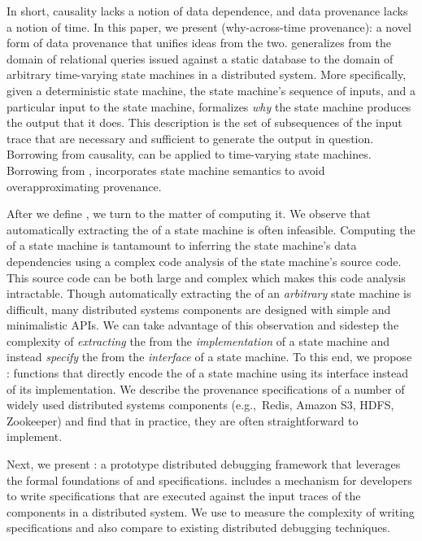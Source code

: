 In short, causality lacks a notion of data dependence, and data provenance
lacks a notion of time. In this paper, we present 
(why-across-time provenance): a novel form of data provenance that unifies
ideas from the two. \Watprovenance{} generalizes \whyprovenance{} from the
domain of relational queries issued against a static database to the domain of
arbitrary time-varying state machines in a distributed system. More
specifically, given a deterministic state machine, the state machine's sequence
of inputs, and a particular input to the state machine, \watprovenance{}
formalizes \emph{why} the state machine produces the output that it does. This
description is the set of subsequences of the input trace that are necessary
and sufficient to generate the output in question. Borrowing from causality,
\watprovenance{} can be applied to time-varying state machines.  Borrowing from
\whyprovenance{}, \watprovenance{} incorporates state machine semantics to
avoid overapproximating provenance.

After we define \watprovenance{}, we turn to the matter of computing it. We
observe that automatically extracting the \watprovenance{} of a state machine
is often infeasible. Computing the \watprovenance{} of a state machine is
tantamount to inferring the state machine's data dependencies using a complex
code analysis of the state machine's source code. This source code can be both
large and complex which makes this code analysis intractable.
%
Though automatically extracting the \watprovenance{} of an \emph{arbitrary}
state machine is difficult, many distributed systems components are designed
with simple and minimalistic APIs. We can take advantage of this observation
and sidestep the complexity of \emph{extracting} the \watprovenance{} from the
\emph{implementation} of a state machine and instead \emph{specify} the
\watprovenance{} from the \emph{interface} of a state machine. To this end, we
propose : functions that directly
encode the \watprovenance{} of a state machine using its interface instead of
its implementation. We describe the provenance specifications of a number of
widely used distributed systems components (e.g.,\ Redis, Amazon S3, HDFS,
Zookeeper) and find that in practice, they are often straightforward to
implement.

Next, we present \fluent{}: a prototype distributed debugging framework that
leverages the formal foundations of \watprovenance{} and \watprovenance{}
specifications. \fluent{} includes a mechanism for developers to write
\watprovenance{} specifications that are executed against the input traces of
the components in a distributed system. We use \fluent{} to measure the
complexity of writing \watprovenance{} specifications and also compare
\fluent{} to existing distributed debugging techniques.

